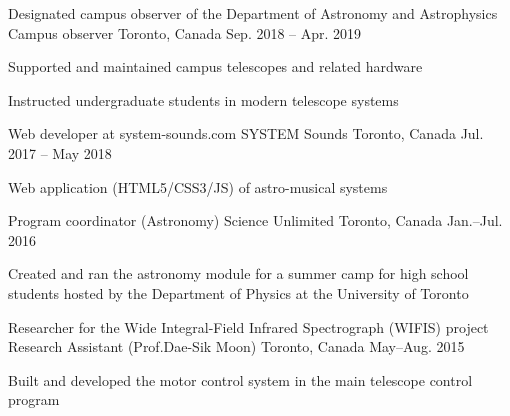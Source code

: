 

\begin{cventries}

  \cventry
    {Designated campus observer of the Department of Astronomy and Astrophysics}
    {Campus observer}
    {Toronto, Canada}
    {Sep. 2018 -- Apr. 2019}
    {
      \begin{cvitems}
        \item {Supported and maintained campus telescopes and related hardware}
        \item {Instructed undergraduate students in modern telescope systems}
      \end{cvitems}
    }
    
  \cventry
    {Web developer at system-sounds.com}
    {SYSTEM Sounds}
    {Toronto, Canada}
    {Jul. 2017 -- May 2018}
    {
      \begin{cvitems}
        \item {Web application (HTML5/CSS3/JS) of astro-musical systems}
      \end{cvitems}
    }
    
  \cventry
    {Program coordinator (Astronomy)}
    {Science Unlimited}
    {Toronto, Canada}
    {Jan.--Jul. 2016}
    {
      \begin{cvitems}
        \item {Created and ran the astronomy module for a summer camp for high school students hosted by the Department of Physics at the University of Toronto}
      \end{cvitems}
    }
    
  \cventry
    {Researcher for the Wide Integral-Field Infrared Spectrograph (WIFIS) project}
    {Research Assistant (Prof.\@ Dae-Sik Moon)}
    {Toronto, Canada}
    {May--Aug. 2015}
    {
      \begin{cvitems}
        \item {Built and developed the motor control system in the main telescope control program}
      \end{cvitems}
    }
    

\end{cventries}
